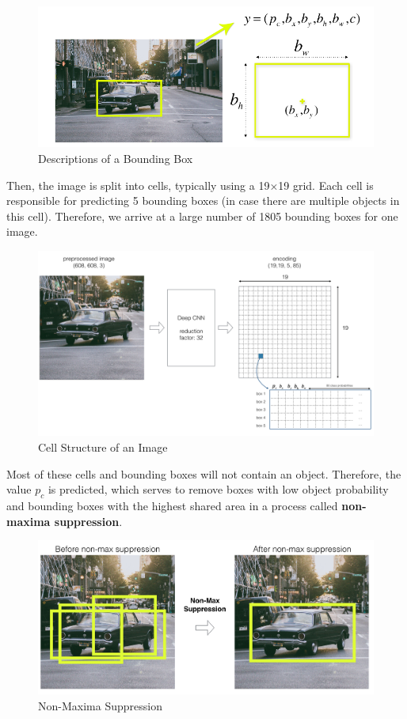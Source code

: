 \documentclass[a4paper]{article}
\begin{document}
\begin{figure}[h]
    \centering
    \includegraphics[width=0.9\linewidth]{Pictures/yoloWorks1.png}
    \caption{Descriptions of a Bounding Box}
    \label{fig:descriptionOfBBox}
\end{figure}

Then, the image is split into cells, typically using a 19×19 grid. Each cell is responsible for predicting 5 bounding boxes (in case there are multiple objects in this cell). Therefore, we arrive at a large number of 1805 bounding boxes for one image.

\begin{figure}[h!]
    \centering
    \includegraphics[width=0.9\linewidth]{Pictures/yoloWorks2.png}
    \caption{Cell Structure of an Image}
    \label{fig:StructImg}
\end{figure}

Most of these cells and bounding boxes will not contain an object. Therefore, the value $p_c$ is predicted, which serves to remove boxes with low object probability and bounding boxes with the highest shared area in a process called \textbf{non-maxima suppression}.

\begin{figure}[h!]
    \centering
    \includegraphics[width=0.9\linewidth]{Pictures/yoloWorks3.png}
    \caption{Non-Maxima Suppression}
    \label{fig:NMS}
\end{figure}
\pagebreak
\end{document}
